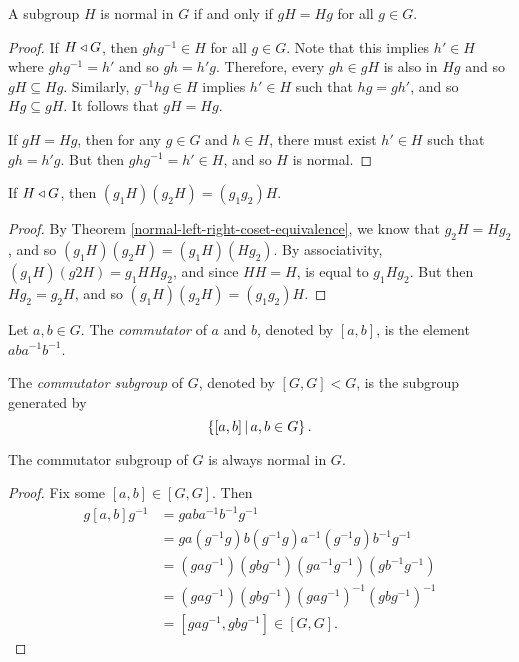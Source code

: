 \begin{thm}\label{normal-left-right-coset-equivalence}
    A subgroup $H$ is normal in $G$ if and only if $gH = Hg$ for all $g \in G$.
\end{thm}

\begin{proof}
    If $H \triangleleft G$, then $ghg^{-1} \in H$ for all $g \in G$. Note that this implies $h' \in H$ where $ghg^{-1} = h'$ and so $gh = h'g$. Therefore, every $gh \in gH$ is also in $Hg$ and so $gH \subseteq Hg$. Similarly, $g^{-1}hg \in H$ implies $h' \in H$ such that $hg = gh'$, and so $Hg \subseteq gH$. It follows that $gH = Hg$.

    If $gH = Hg$, then for any $g \in G$ and $h \in H$, there must exist $h' \in H$ such that $gh = h'g$. But then $ghg^{-1} = h' \in H$, and so $H$ is normal.
\end{proof}

\begin{cor}\label{normal-cosets-product}
    If $H \triangleleft G$, then $(g_1H)(g_2H) = (g_1g_2)H$.
\end{cor}

\begin{proof}
    By Theorem \ref{normal-left-right-coset-equivalence}, we know that $g_2H = Hg_2$, and so $(g_1H)(g_2H) = (g_1H)(Hg_2)$. By associativity, $(g_1H)(g2H) = g_1HHg_2$, and since $HH = H$, is equal to $g_1Hg_2$. But then $Hg_2 = g_2H$, and so $(g_1H)(g_2H) = (g_1g_2)H$.
\end{proof}

\begin{defn}
    Let $a, b \in G$. The \emph{commutator} of $a$ and $b$, denoted by $[a, b]$, is the element $aba^{-1}b^{-1}$.
\end{defn}

\begin{defn}
    The \emph{commutator subgroup} of $G$, denoted by $[G, G] < G$, is the subgroup generated by
    \[\left\{[a, b] \,\middle|\, a, b \in G\right\}.\]
\end{defn}

\begin{thm}\label{commutator-normal-subgroup}
    The commutator subgroup of $G$ is always normal in $G$.
\end{thm}

\begin{proof}
    Fix some $[a, b] \in [G, G]$. Then
    \begin{align*}
        g[a, b]g^{-1} &= gaba^{-1}b^{-1}g^{-1} \\
        &= ga(g^{-1}g)b(g^{-1}g)a^{-1}(g^{-1}g)b^{-1}g^{-1} \\
        &= (gag^{-1})(gbg^{-1})(ga^{-1}g^{-1})(gb^{-1}g^{-1}) \\
        &= (gag^{-1})(gbg^{-1})(gag^{-1})^{-1}(gbg^{-1})^{-1} \\
        &= [gag^{-1}, gbg^{-1}] \in [G, G].
    \end{align*}
\end{proof}

